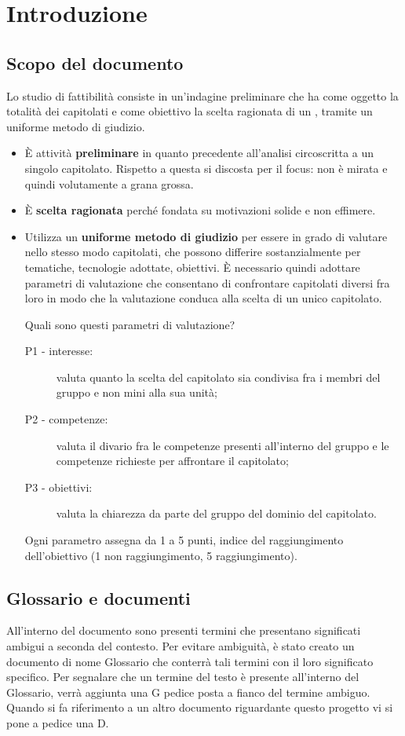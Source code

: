 \section{Introduzione}

\subsection{Scopo del documento}
Lo studio di fattibilità consiste in un'indagine preliminare che ha come oggetto la totalità dei capitolati e come obiettivo la scelta ragionata di un , tramite un uniforme metodo di giudizio. 
\begin{itemize}
	\item È attività \textbf{preliminare} in quanto precedente all'analisi circoscritta a un singolo capitolato. Rispetto a questa si discosta per il focus: non è mirata e quindi volutamente a grana grossa. 
	\item È \textbf{scelta ragionata} perché fondata su motivazioni solide e non effimere.
	\item Utilizza un \textbf{uniforme metodo di giudizio} per essere in grado di valutare nello stesso modo capitolati, che possono differire sostanzialmente per tematiche, tecnologie adottate, obiettivi. È necessario quindi adottare parametri di valutazione che consentano di confrontare capitolati diversi fra loro in modo che la valutazione conduca alla scelta di un unico capitolato. 
	
	Quali sono questi parametri di valutazione? 
	\begin{description}
		\item[P1 - interesse:] valuta quanto la scelta del capitolato sia condivisa fra i membri del gruppo e non mini alla sua unità;
		\item[P2 - competenze:] valuta il divario fra le competenze presenti all'interno del gruppo e le competenze richieste per affrontare il capitolato;
		\item[P3 - obiettivi:] valuta la chiarezza da parte del gruppo del dominio del capitolato. 
	\end{description}
	Ogni parametro assegna da 1 a 5 punti, indice del raggiungimento dell'obiettivo (1 non raggiungimento, 5 raggiungimento).
\end{itemize}
 
\subsection{Glossario e documenti} 
All'interno del  documento sono presenti termini che presentano significati ambigui a seconda del contesto.
Per evitare ambiguità, è stato creato un  documento di nome Glossario che  conterrà tali termini con il loro significato specifico. Per segnalare che un termine del testo è presente all'interno del Glossario, verrà aggiunta una G pedice posta a fianco del termine ambiguo.
Quando si fa riferimento a un altro documento riguardante questo progetto vi si pone a pedice una D.

